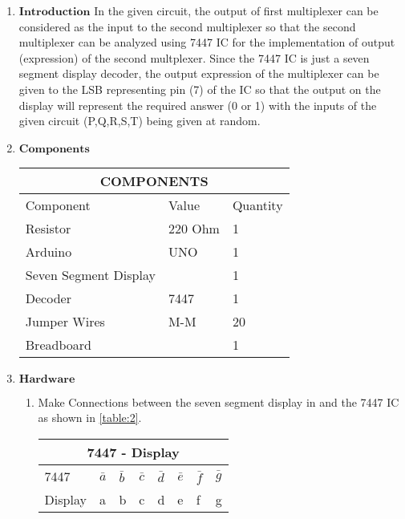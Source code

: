 \documentclass{article}
\begin{document}
\begin{enumerate}
\begin{enumerate}
\end{enumerate}
	\item $\textbf{Introduction}$ \newline\newline
		In the given circuit, the output of first multiplexer can be considered as the input to the second multiplexer so that the second multiplexer can be analyzed using 7447 IC for the implementation of output (expression) of the second multplexer. Since the 7447 IC is just a seven segment display decoder, the output expression of the multiplexer can be given to the LSB representing pin (7) of the IC so that the output on the display will represent the required answer (0 or 1) with the inputs of the given circuit (P,Q,R,S,T) being given at random.\newline
	\item $\textbf{Components}$
		\newline {}\label{table:1}\begin{tabular}{|p{5cm}|p{3cm}|p{2cm}|}
			\hline
			\multicolumn{3}{|c|}{COMPONENTS}\\
			\hline
			Component& Value& Quantity\\
			\hline
			Resistor &220 Ohm& 1\\
			\hline
			Arduino& UNO& 1\\
			\hline
			Seven Segment Display&  & 1\\
			\hline
			Decoder& 7447& 1\\
			\hline
			Jumper Wires& M-M& 20\\
			\hline
			Breadboard&  & 1\\
			\hline
		\end{tabular}
	\newline\newline\item $\textbf{Hardware}$
		\begin{enumerate}
			\item Make Connections between the seven segment display in and the 7447 IC as shown in \ref{table:2}.
				\newline {}\label{table:2}\begin{tabular}{|p{3cm}|p{1cm}|p{1cm}|p{1cm}|p{1cm}|p{1cm}|p{1cm}|p{1cm}|}
					\hline
					\multicolumn{8}{|c|}{7447 - Display}\\
					\hline
					7447& $\bar{a}$ & $\bar{b}$ & $\bar{c}$ & $\bar{d}$ & $\bar{e}$ & $\bar{f}$ & $\bar{g}$ \\
					\hline
					Display& a& b& c& d& e& f& g\\

\end{tabular}
\end{enumerate}
\end{enumerate}
\end{document}
